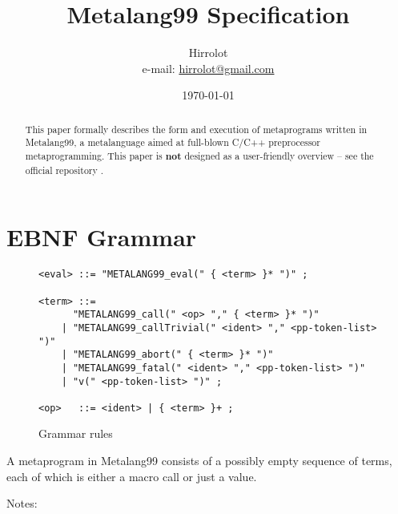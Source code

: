 \documentclass[12pt]{article}
\theoremstyle{break}
\begin{document}
\title{Metalang99 Specification}
\date{\today}
\author{Hirrolot \\ e-mail: \href{mailto:hirrolot@gmail.com}{hirrolot@gmail.com}}
\maketitle

\begin{abstract}
This paper formally describes the form and execution of metaprograms written in
Metalang99, a metalanguage aimed at full-blown C/C++ preprocessor metaprogramming. This paper
is \textbf{not} designed as a user-friendly overview -- see the official repository
\cite{Metalang99}.
\end{abstract}

\tableofcontents

\newpage

\section{EBNF Grammar}

\begin{figure}[H]
    \caption{Grammar rules}

\begin{verbatim}
<eval> ::= "METALANG99_eval(" { <term> }* ")" ;

<term> ::=
      "METALANG99_call(" <op> "," { <term> }* ")"
    | "METALANG99_callTrivial(" <ident> "," <pp-token-list> ")"
    | "METALANG99_abort(" { <term> }* ")"
    | "METALANG99_fatal(" <ident> "," <pp-token-list> ")"
    | "v(" <pp-token-list> ")" ;

<op>   ::= <ident> | { <term> }+ ;
\end{verbatim}

\end{figure}

A metaprogram in Metalang99 consists of a possibly empty sequence of terms, each of which
is either a macro call or just a value.

Notes:
\end{document}
